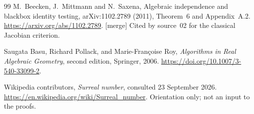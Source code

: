 \documentclass[11pt,letterpaper]{article}
\numberwithin{equation}{section}
\theoremstyle{definition}
\theoremstyle{remark}
\newcommand{\mtag}{\textup{[merge]}}%
\begin{document}
\begin{thebibliography}{99}
M.~Beecken, J.~Mittmann and N.~Saxena,
Algebraic independence and blackbox identity testing,
arXiv:1102.2789 (2011), Theorem~6 and Appendix~A.2.
\url{https://arxiv.org/abs/1102.2789}.
\mtag{} Cited by source~02 for the classical Jacobian criterion.

Saugata Basu, Richard Pollack, and Marie-Fran\c{c}oise Roy,
\emph{Algorithms in Real Algebraic Geometry}, second edition,
Springer, 2006.
\url{https://doi.org/10.1007/3-540-33099-2}.

Wikipedia contributors, \emph{Surreal number}, consulted 23 September 2026.
\url{https://en.wikipedia.org/wiki/Surreal_number}.
Orientation only; not an input to the proofs.
\end{thebibliography}
\end{document}
